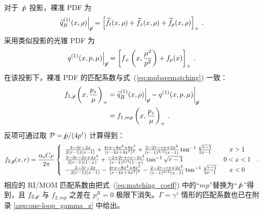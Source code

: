 对于 $\slashed{p}$ 投影，裸准 PDF 为
\begin{align}
\widetilde{q}_B^{(1)}(x,\rho)\Big|_{\slashed{p}}=\left[\widetilde{f}_t(x,\rho)+\widetilde{f}_z(x,\rho)+\widetilde{f}_p(x,\rho)\right]_+\,.
\end{align}
采用类似投影的光锥 PDF 为
\begin{align}
q^{(1)}(x,p,\mu)\Big|_{\slashed{p}}=\left[f_+\left(x,\frac{\mu^2}{p^2}\right)+f_p(x)\right]_+\,.
\end{align}
在该投影下，裸准 PDF 的匹配系数与式~(\ref{eq:mpbarematching}) 一致：
\begin{align}
f_{1,\slashed p}\left(x,\frac{p_z}{\mu}\right)_+&= \widetilde{q}^{(1)}_B(x,\rho)\Big|_{\slashed p}-q^{(1)}(x,p,\mu)\bigg|_{\slashed p} \nn\\
&=f_{1,mp}\left(x,\frac{p_z}{\mu}\right)_+\,.
\end{align}
反项可通过取 ${\cal P}=\slashed{p}/(4p^t)$ 计算得到：
\begin{align}
f_{2,\slashed{p}}(x,r)=\frac{\alpha_s C_F}{2\pi}\left\{
\begin{array}{lc}
\frac{3-3r-2x}{2(r-1)(x-1)}+\frac{4rx-8x^2+8x^3}{(r-4x+4x^2)^2}+\frac{2-2r-rx+2x^2}{(r-1)^{3/2}(x-1)}\tan^{-1}\frac{\sqrt{r-1}}{2x-1} & x>1\\
\frac{3-3r-2x+4x^2}{2(r-1)(1-x)}+\frac{-2+2r+rx-2x^2}{(r-1)^{3/2}(1-x)}\tan^{-1}\sqrt{r-1} & 0<x<1\\
-\frac{3-3r-2x}{2(r-1)(x-1)}-\frac{4rx-8x^2+8x^3}{(r-4x+4x^2)^2}-\frac{2-2r-rx+2x^2}{(r-1)^{3/2}(x-1)}\tan^{-1}\frac{\sqrt{r-1}}{2x-1} & x<0
\end{array} \right.\,.
\end{align}
相应的 RI/MOM 匹配系数由把式~(\ref{eq:matching_coeff}) 中的“$mp$”替换为“$\slashed p$”得到，且 $f_{2,\slashed{p}}$ 与 $f_{2,mp}$ 之差在 $p_z^R=0$ 极限下消失。$\Gamma=\gamma^z$ 情形的匹配系数也已在附录 \ref{app:one-loop_gamma_z} 中给出。
